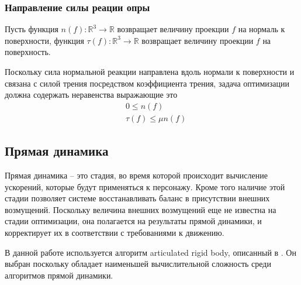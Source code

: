\subsubsection{Направление силы реации опры}

Пусть функция $n(f): \mathbb{R}^{3} \rightarrow \mathbb{R}$ возвращает величину проекции $f$ на нормаль к поверхности, функция $\tau(f): \mathbb{R}^{3} \rightarrow \mathbb{R}$ возвращает величину проекции $f$ на поверхность.

Поскольку сила нормальной реакции направлена вдоль нормали к поверхности и связана с силой трения посредством коэффициента трения, задача оптимизации должна содержать неравенства выражающие это
\begin{align*}
&\ 0 \le n(f) \tag{2.18}\label{ineq:2.18} \\
&\ \tau(f) \le \mu n(f) \tag{2.19}\label{ineq:2.19}
\end{align*}

\subsection{Прямая динамика}

Прямая динамика -- это стадия, во время которой происходит вычисление ускорений, которые будут применяться к персонажу. Кроме того наличие этой стадии позволяет системе восстанавливать баланс в присутствии внешних возмущений. Поскольку величина внешних возмущений еще не известна на стадии оптимизации, она полагается на результаты прямой динамики, и корректирует их в соответствии с требованиями к движению.

В данной работе используется алгоритм articulated rigid body, описанный в \cite{Featherstone}. Он выбран поскольку обладает наименьшей вычислительной сложность среди алгоритмов прямой динамики.
